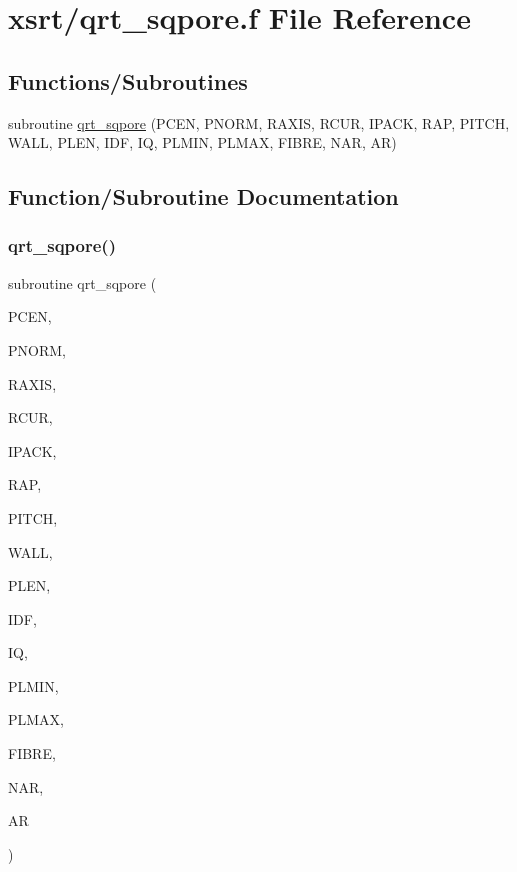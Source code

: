 \hypertarget{qrt__sqpore_8f}{}\section{xsrt/qrt\+\_\+sqpore.f File Reference}
\label{qrt__sqpore_8f}
\subsection*{Functions/\+Subroutines}
\begin{DoxyCompactItemize}
\item 
subroutine \hyperlink{qrt__sqpore_8f_a74948deb8d4c4180d706a41154c6d9d3}{qrt\+\_\+sqpore} (P\+C\+EN, P\+N\+O\+RM, R\+A\+X\+IS, R\+C\+UR, I\+P\+A\+CK, R\+AP, P\+I\+T\+CH, W\+A\+LL, P\+L\+EN, I\+DF, IQ, P\+L\+M\+IN, P\+L\+M\+AX, F\+I\+B\+RE, N\+AR, AR)
\end{DoxyCompactItemize}


\subsection{Function/\+Subroutine Documentation}
\mbox{\label{qrt__sqpore_8f_a74948deb8d4c4180d706a41154c6d9d3}} 
\subsubsection{\texorpdfstring{qrt\+\_\+sqpore()}{qrt\_sqpore()}}
{\footnotesize\ttfamily subroutine qrt\+\_\+sqpore (\begin{DoxyParamCaption}\item[{double precision, dimension(3)}]{P\+C\+EN,  }\item[{double precision, dimension(3)}]{P\+N\+O\+RM,  }\item[{double precision, dimension(3)}]{R\+A\+X\+IS,  }\item[{double precision}]{R\+C\+UR,  }\item[{integer}]{I\+P\+A\+CK,  }\item[{double precision}]{R\+AP,  }\item[{double precision}]{P\+I\+T\+CH,  }\item[{double precision}]{W\+A\+LL,  }\item[{double precision}]{P\+L\+EN,  }\item[{integer}]{I\+DF,  }\item[{integer}]{IQ,  }\item[{double precision}]{P\+L\+M\+IN,  }\item[{double precision}]{P\+L\+M\+AX,  }\item[{double precision}]{F\+I\+B\+RE,  }\item[{integer}]{N\+AR,  }\item[{double precision, dimension(nar)}]{AR }\end{DoxyParamCaption})}

